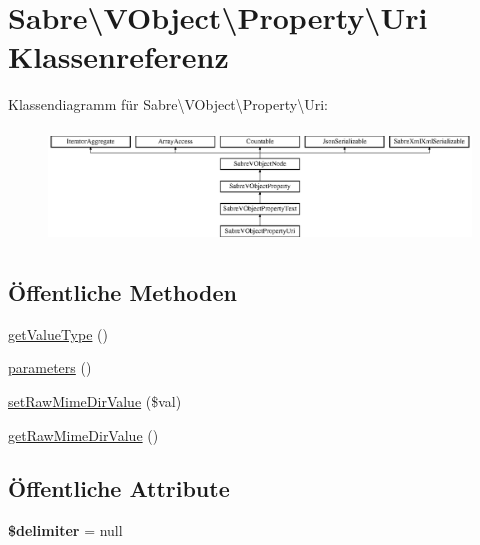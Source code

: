 \hypertarget{class_sabre_1_1_v_object_1_1_property_1_1_uri}{}\section{Sabre\textbackslash{}V\+Object\textbackslash{}Property\textbackslash{}Uri Klassenreferenz}
\label{class_sabre_1_1_v_object_1_1_property_1_1_uri}
Klassendiagramm für Sabre\textbackslash{}V\+Object\textbackslash{}Property\textbackslash{}Uri\+:\begin{figure}[H]
\begin{center}
\leavevmode
\includegraphics[height=3.043478cm]{class_sabre_1_1_v_object_1_1_property_1_1_uri}
\end{center}
\end{figure}
\subsection*{Öffentliche Methoden}
\begin{DoxyCompactItemize}
\item 
\mbox{\hyperlink{class_sabre_1_1_v_object_1_1_property_1_1_uri_a1d3ad32d0552b9d87ae972236abbfdc7}{get\+Value\+Type}} ()
\item 
\mbox{\hyperlink{class_sabre_1_1_v_object_1_1_property_1_1_uri_a482969f1abd6a4d41de782c6ae065bd3}{parameters}} ()
\item 
\mbox{\hyperlink{class_sabre_1_1_v_object_1_1_property_1_1_uri_acb52709433ae724f1a1bbab7126335af}{set\+Raw\+Mime\+Dir\+Value}} (\$val)
\item 
\mbox{\hyperlink{class_sabre_1_1_v_object_1_1_property_1_1_uri_ab0b28f212e1e4d937223ff731afecdca}{get\+Raw\+Mime\+Dir\+Value}} ()
\end{DoxyCompactItemize}
\subsection*{Öffentliche Attribute}
\begin{DoxyCompactItemize}
\item 
\mbox{\label{class_sabre_1_1_v_object_1_1_property_1_1_uri_a31de90325328c36966a27a9e2ed1ab7a}} 
{\bfseries \$delimiter} = null
\end{DoxyCompactItemize}
